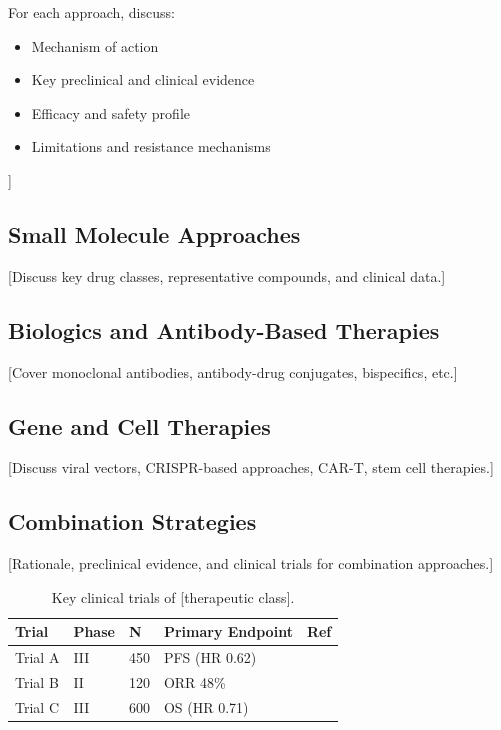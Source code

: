 \documentclass[11pt,a4paper]{article}
\begin{document}
For each approach, discuss:
\begin{itemize}
    \item Mechanism of action
    \item Key preclinical and clinical evidence
    \item Efficacy and safety profile
    \item Limitations and resistance mechanisms
\end{itemize}]

\subsection{Small Molecule Approaches}
[Discuss key drug classes, representative compounds, and clinical data.]

\subsection{Biologics and Antibody-Based Therapies}
[Cover monoclonal antibodies, antibody-drug conjugates, bispecifics, etc.]

\subsection{Gene and Cell Therapies}
[Discuss viral vectors, CRISPR-based approaches, CAR-T, stem cell therapies.]

\subsection{Combination Strategies}
[Rationale, preclinical evidence, and clinical trials for combination approaches.]

\begin{table}[ht]
\centering
\caption{Key clinical trials of [therapeutic class].}
\label{tab:trials}
\begin{tabular}{lllll}
\toprule
\textbf{Trial} & \textbf{Phase} & \textbf{N} & \textbf{Primary Endpoint} & \textbf{Ref} \\
\midrule
Trial A & III & 450 & PFS (HR 0.62) & \citep{trial2024} \\
Trial B & II & 120 & ORR 48\% & \citep{trial2023} \\
Trial C & III & 600 & OS (HR 0.71) & \citep{trial2024b} \\
\bottomrule
\end{tabular}
\end{table}
\end{document}
